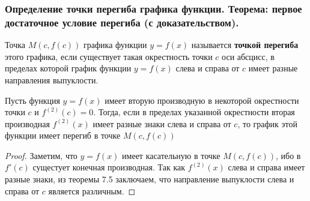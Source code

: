 \documentclass[10pt]{article}
\begin{document}
    \subsubsection{Определение точки перегиба графика функции. Теорема: первое достаточное условие перегиба (с доказательством).}
    \begin{definition}
        Точка $M(c, f(c))$ графика функции $y = f(x)$ называется \textbf{точкой перегиба} этого графика, если существует такая окрестность точки $c$ оси абсцисс, в пределах которой график функции $y = f(x)$ слева и справа от $c$ имеет разные направления выпуклости.
    \end{definition}
    \begin{theorem}
        Пусть функция $y = f(x)$ имеет вторую производную в некоторой окрестности точки $c$ и $f^{(2)}(c) = 0$. Тогда, если в пределах указанной окрестности вторая производная $f^{(2)}(x)$ имеет разные знаки слева и справа от $c$, то график этой функции имеет перегиб в точке $M(c, f(c))$
    \end{theorem}
    \begin{proof}
        Заметим, что $y = f(x)$ имеет касательную в точке $M(c, f(c))$, ибо в $f'(c)$ сущестует конечная производная. Так как $f^{(2)}(x)$ слева и справа имеет разные знаки, из теоремы 7.5 заключаем, что направление выпуклости слева и справа от $c$ является различным.
    \end{proof}
\end{document}
